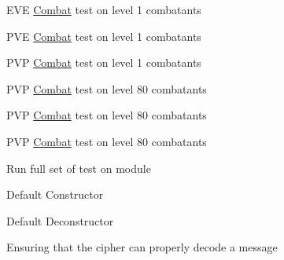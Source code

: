 \begin{DoxyRefList}
%
EVE \mbox{\hyperlink{classCombat}{Combat}} test on level 1 combatants  
\item[Member \mbox{\hyperlink{classTestBattle_a2f2a420d04a578451c15675444f8a8e5}{Test\+Battle\+::level1\+\_\+pve}} ()]\label{todo__todo000193}%
%
PVE \mbox{\hyperlink{classCombat}{Combat}} test on level 1 combatants  
\item[Member \mbox{\hyperlink{classTestBattle_a161b6545d121720d3e1360f30b5c202a}{Test\+Battle\+::level1\+\_\+pvp}} ()]\label{todo__todo000194}%
%
PVP \mbox{\hyperlink{classCombat}{Combat}} test on level 1 combatants  
\item[Member \mbox{\hyperlink{classTestBattle_a5d6740d3052381ff7db4cd3f3b3b61c7}{Test\+Battle\+::level80\+\_\+eve}} ()]\label{todo__todo000195}%
%
PVP \mbox{\hyperlink{classCombat}{Combat}} test on level 80 combatants  
\item[Member \mbox{\hyperlink{classTestBattle_a2972366229e66ec699642dacefae80ea}{Test\+Battle\+::level80\+\_\+pve}} ()]\label{todo__todo000196}%
%
PVP \mbox{\hyperlink{classCombat}{Combat}} test on level 80 combatants  
\item[Member \mbox{\hyperlink{classTestBattle_ab20323a23c6954e3443ce3499cef2a11}{Test\+Battle\+::level80\+\_\+pvp}} ()]\label{todo__todo000197}%
%
PVP \mbox{\hyperlink{classCombat}{Combat}} test on level 80 combatants  
\item[Member \mbox{\hyperlink{classTestBattle_a5b4d4bfb476dea566db72367d80521a6}{Test\+Battle\+::test\+\_\+all}} ()]\label{todo__todo000191}%
%
Run full set of test on module  
\item[Member \mbox{\hyperlink{classTestBattle_a4db7924af5371bb557e285897542c073}{Test\+Battle\+::Test\+Battle}} ()]\label{todo__todo000190}%
%
Default Constructor  
\item[Member \mbox{\hyperlink{classTestBattle_aebe76605d0317113192acc262fa6371b}{Test\+Battle\+::$\sim$\+Test\+Battle}} ()]\label{todo__todo000198}%
%
Default Deconstructor  
\item[Member \mbox{\hyperlink{classTestCiphers_a68c1d7f7043a395e8e960b11cb22dff0}{Test\+Ciphers\+::decode}} ()]\label{todo__todo000202}%
%
Ensuring that the cipher can properly decode a message  
\item[Member \mbox{\hyperlink{classTestCiphers_ae2915b859096bf90c357d7b5b542a89d}{Test\+Ciphers\+::display\+Matrix}} ()]\label{todo__todo000201}%

\end{DoxyRefList}
